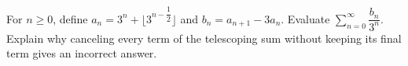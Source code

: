 For $n\ge0$, define $a_n=3^n+\lfloor3^{n-\dfrac{1}{2}}\rfloor$ and $b_n=a_{n+1}-3a_n$. Evaluate $\sum_{n=0}^{\infty}\dfrac{b_n}{3^n}$. Explain why canceling every term of the telescoping sum without keeping its final term gives an incorrect answer.
